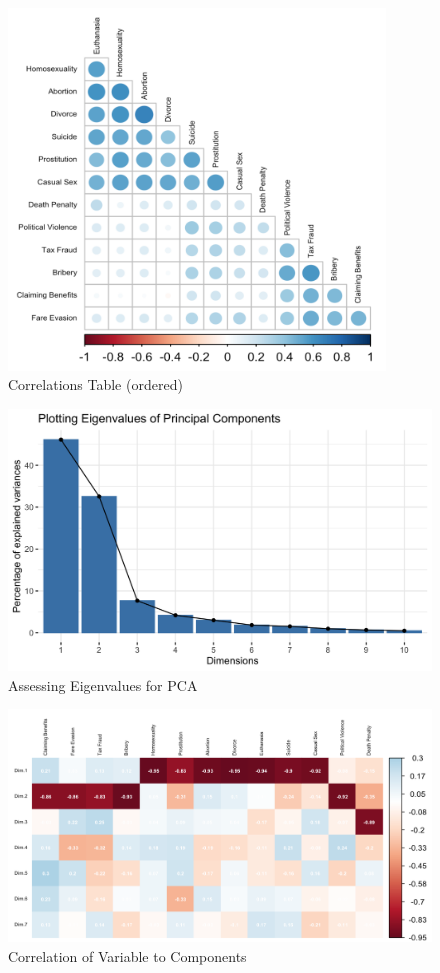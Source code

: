 \documentclass{article}[hidelinks]
\begin{document}
\begin{figure}[h]
    \centering
    \includegraphics[width=100mm]{correlations.png}
    \caption{Correlations Table (ordered)}
    \label{fig:correlation}
\end{figure}

\begin{figure}[h]
    \centering
    \includegraphics[width=150mm]{components_world.png}
    \caption{Assessing Eigenvalues for PCA}
    \label{fig:pca_eigenvalues}
\end{figure}

\begin{figure}[h]
    \centering
    \includegraphics[width=150mm]{cor_Components.png}
    \caption{Correlation of Variable to Components}
    \label{fig:final}
\end{figure}
\end{document}

